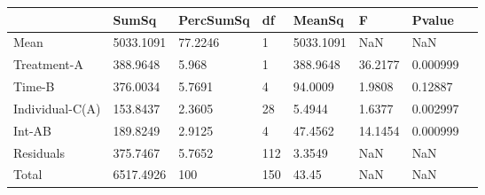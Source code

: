 \begin{table} 
\begin{tabular}{llllllll}
 & SumSq & PercSumSq & df & MeanSq & F & Pvalue \\ 
 \hline 
Mean & 5033.1091 & 77.2246 & 1 & 5033.1091 & NaN & NaN \\ 
Treatment-A & 388.9648 & 5.968 & 1 & 388.9648 & 36.2177 & 0.000999 \\ 
Time-B & 376.0034 & 5.7691 & 4 & 94.0009 & 1.9808 & 0.12887 \\ 
Individual-C(A) & 153.8437 & 2.3605 & 28 & 5.4944 & 1.6377 & 0.002997 \\ 
Int-AB & 189.8249 & 2.9125 & 4 & 47.4562 & 14.1454 & 0.000999 \\ 
Residuals & 375.7467 & 5.7652 & 112 & 3.3549 & NaN & NaN \\ 
Total & 6517.4926 & 100 & 150 & 43.45 & NaN & NaN \\ 
\end{tabular} 
\end{table} 
